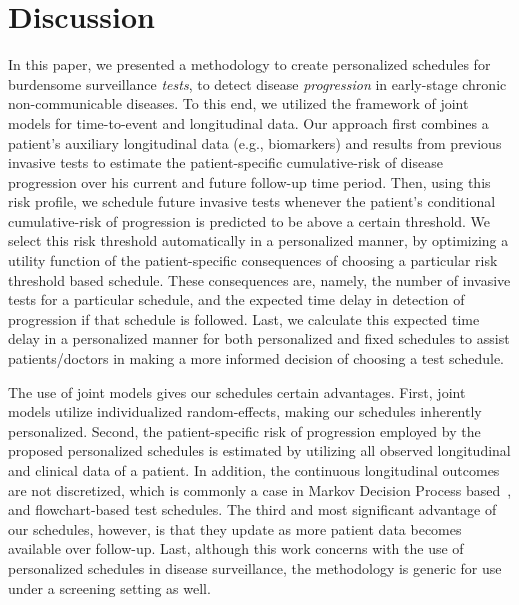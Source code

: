 \section{Discussion}
\label{sec:discussion}
In this paper, we presented a methodology to create personalized schedules for burdensome surveillance \textit{tests}, to detect disease \textit{progression} in early-stage chronic non-communicable diseases. To this end, we utilized the framework of joint models for time-to-event and longitudinal data. Our approach first combines a patient's auxiliary longitudinal data (e.g., biomarkers) and results from previous invasive tests to estimate the patient-specific cumulative-risk of disease progression over his current and future follow-up time period. Then, using this risk profile, we schedule future invasive tests whenever the patient's conditional cumulative-risk of progression is predicted to be above a certain threshold. We select this risk threshold automatically in a personalized manner, by optimizing a utility function of the patient-specific consequences of choosing a particular risk threshold based schedule. These consequences are, namely, the number of invasive tests for a particular schedule, and the expected time delay in detection of progression if that schedule is followed. Last, we calculate this expected time delay in a personalized manner for both personalized and fixed schedules to assist patients/doctors in making a more informed decision of choosing a test schedule.

The use of joint models gives our schedules certain advantages. First, joint models utilize individualized random-effects, making our schedules inherently personalized. Second, the patient-specific risk of progression employed by the proposed personalized schedules is estimated by utilizing all observed longitudinal and clinical data of a patient. In addition, the continuous longitudinal outcomes are not discretized, which is commonly a case in Markov Decision Process based~\citep{alagoz2010operations, steimle2017markov}, and flowchart-based test schedules. The third and most significant advantage of our schedules, however, is that they update as more patient data becomes available over follow-up. Last, although this work concerns with the use of personalized schedules in disease surveillance, the methodology is generic for use under a screening setting as well.

